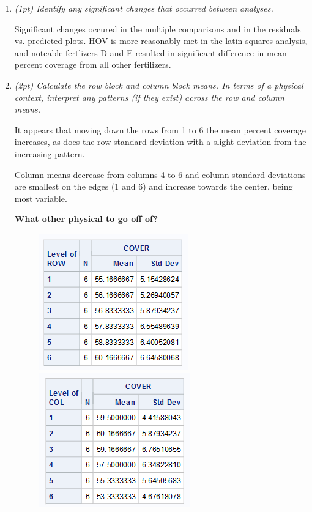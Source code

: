 \documentclass{article}\usepackage[]{graphicx}\usepackage[]{color}
\begin{document}
\begin{enumerate}
\begin{enumerate}
{\bf CODE FOR LATIN SQUARES ANALYSIS}

\begin{verbatim}
proc glm data = in plots = (all);
class row col fert;
model cover = row col fert /ss3;
means row col;
means fert /tukey alpha=0.05;
output out=diag p=pred r=resid;
title 'LATIN SQUARES ANALYSIS';
run;
\end{verbatim}

\item
{\it (1pt) Identify any significant changes that occurred between analyses.}

Significant changes occured in the multiple comparisons and in the residuals vs. predicted plots. HOV is more reasonably met in the latin squares analysis, and noteable fertlizers D and E resulted in significant difference in mean percent coverage from all other fertilizers.

\item 
{\it (2pt) Calculate the row block and column block means. In terms of a physical context, interpret any patterns (if they exist) across the row and column means.}

It appears that moving down the rows from 1 to 6 the mean percent coverage increases, as does the row standard deviation with a slight deviation from the increasing pattern.

Column means decrease from columns 4 to 6 and column standard deviations are smallest on the edges (1 and 6) and increase towards the center, being most variable.

{\bf What other physical to go off of?}

\begin{figure}
\centering
\begin{minipage}{.5\textwidth}
\includegraphics{row1}
\end{minipage}%
\begin{minipage}{.5\textwidth}
\centering
\includegraphics{col1}
\end{minipage}
\end{figure}


\end{enumerate}
\end{enumerate}
\end{document}
